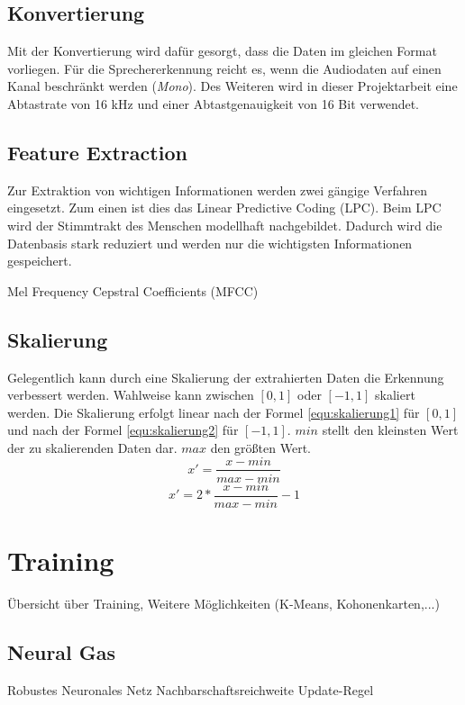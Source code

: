 \subsection{Konvertierung}
Mit der Konvertierung wird dafür gesorgt, dass die Daten im gleichen Format vorliegen. Für die Sprechererkennung reicht es, wenn die Audiodaten auf einen Kanal beschränkt werden (\emph{Mono}). Des Weiteren wird in dieser Projektarbeit eine Abtastrate von 16 kHz und einer Abtastgenauigkeit von 16 Bit verwendet.

\subsection{Feature Extraction}
Zur Extraktion von wichtigen Informationen werden zwei gängige Verfahren eingesetzt. Zum einen ist dies das Linear Predictive Coding (LPC). Beim LPC wird der Stimmtrakt des Menschen modellhaft nachgebildet. Dadurch wird die Datenbasis stark reduziert und werden nur die wichtigsten Informationen gespeichert.

Mel Frequency Cepstral Coefficients (MFCC)

\subsection{Skalierung}
Gelegentlich kann durch eine Skalierung der extrahierten Daten die Erkennung verbessert werden. Wahlweise kann zwischen $[0,1]$ oder $[-1,1]$ skaliert werden. Die Skalierung erfolgt linear nach der Formel \ref{equ:skalierung1} für $[0,1]$ und nach der Formel \ref{equ:skalierung2} für $[-1,1]$. $min$ stellt den kleinsten Wert der zu skalierenden Daten dar. $max$ den größten Wert. \cite{bib:svmfaq}
\begin{equation}
	\label{equ:skalierung1}
	x'=\frac{x-min}{max-min}
\end{equation}
\begin{equation}
	\label{equ:skalierung2}
	x'=2*\frac{x-min}{max-min}-1
\end{equation}

\section{Training}
Übersicht über Training, Weitere Möglichkeiten (K-Means, Kohonenkarten,...)
\subsection{Neural Gas}
Robustes Neuronales Netz
Nachbarschaftsreichweite
Update-Regel
